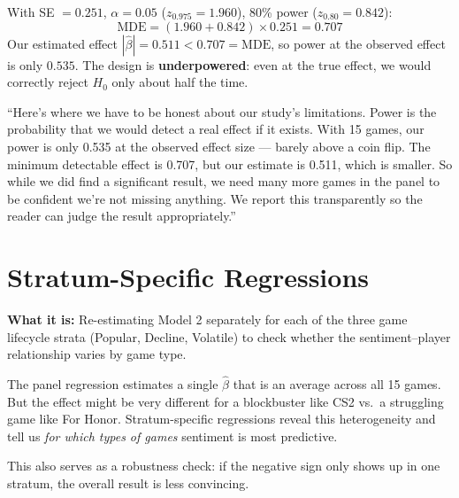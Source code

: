 \documentclass[11pt, letterpaper]{article}
\theoremstyle{definition}
\begin{document}
\begin{resultbox}
With SE $= 0.251$, $\alpha = 0.05$ ($z_{0.975} = 1.960$), 80\% power ($z_{0.80} = 0.842$):
\[
    \text{MDE} = (1.960 + 0.842)\times 0.251 = 0.707
\]
Our estimated effect $|\hat{\beta}| = 0.511 < 0.707 = \text{MDE}$, so power at the observed effect is only $\mathbf{0.535}$.
The design is \textbf{underpowered}: even at the true effect, we would correctly reject $H_0$ only about half the time.
\end{resultbox}

\begin{speakerbox}
``Here's where we have to be honest about our study's limitations.
Power is the probability that we would detect a real effect if it exists.
With 15 games, our power is only 0.535 at the observed effect size --- barely above a coin flip.
The minimum detectable effect is 0.707, but our estimate is 0.511, which is smaller.
So while we did find a significant result, we need many more games in the panel to be confident we're not missing anything.
We report this transparently so the reader can judge the result appropriately.''
\end{speakerbox}

\section{Stratum-Specific Regressions}

\textbf{What it is:} Re-estimating Model 2 separately for each of the three game lifecycle strata (Popular, Decline, Volatile) to check whether the sentiment--player relationship varies by game type.

\begin{whybox}
The panel regression estimates a single $\hat{\beta}$ that is an average across all 15 games.
But the effect might be very different for a blockbuster like CS2 vs.\ a struggling game like For Honor.
Stratum-specific regressions reveal this heterogeneity and tell us \emph{for which types of games} sentiment is most predictive.

This also serves as a robustness check: if the negative sign only shows up in one stratum, the overall result is less convincing.
\end{whybox}
\end{document}
